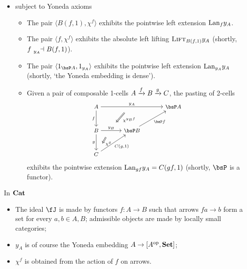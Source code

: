 \documentclass{beamer}
\begin{document}
\begin{frame}
	\begin{itemize}
		\item subject to \alert{Yoneda axioms}
		      \begin{itemize}
			      \item<2->  The pair $\langle B(f,1), \chi^f\rangle$ exhibits the pointwise left extension $\mathrm{Lan}_fy_A$.
			      \item<3->  The pair $\langle f, \chi^f\rangle$ exhibits the absolute left lifting $\textsc{Lift}_{B(f,1)}y_A$ (\alert{shortly, $f\reladjL{y_A} B(f,1)$}).
			      \item<4->  The pair $\langle 1_{\bsP A}, 1_{y_A} \rangle$ exhibits the pointwise left extension $\mathrm{Lan}_{y_A}y_A$ (\alert{shortly, `the Yoneda embedding is dense'}).
			      \item<5->  Given a pair of composable 1-cells $A \xrightarrow{f} B\xrightarrow{g} C$, the
			            pasting of 2-cells
			            $$ \footnotesize \begin{tikzcd}[column sep=large, row sep=large,ampersand replacement=\&] A\ar[d, "f"']\ar[rr, "y_A"{name=yonA}] \&\& \bsP A\\ B \ar[r, "y_B"{name=yonB}]\ar[d, "g"'] \& \bsP B\ar[ur, "\bsP f"']\\ C\ar[ur, "{C(g,1)}"'] \ar[from=yonA, to=yonB, shorten >=2mm, shorten <=4mm, Rightarrow, "\chi^{y_B f}"] \ar[from=yonB, shorten >=4mm, shorten <=4mm, Rightarrow, "\chi^g"] \end{tikzcd} $$
			            exhibits the pointwise extension $\mathrm{Lan}_{gf}y_A = C(gf,1)$ (\alert{shortly, $\bsP$ is a functor}).
		      \end{itemize}
	\end{itemize}
\end{frame}
\begin{frame}{In $\mathbf{Cat}$}
	\begin{itemize}
		\item The ideal $\fJ$ is made by functors $f : A \to B$ such that arrows $fa\to b$ form a set for every $a,b\in A,B$; admissible objects are made by locally small categories;
		\item<2-> $y_A$ is of course the Yoneda embedding $A \to [A^{\text{op}},\mathbf{Set}]$;
		\item<3-> $\chi^f$ is obtained from the action of $f$ on arrows.
	\end{itemize}
\end{frame}
\end{document}
